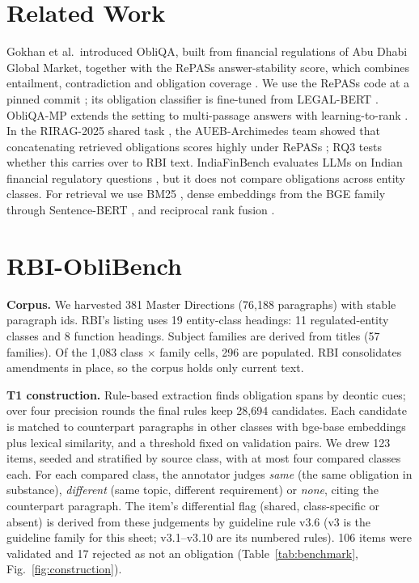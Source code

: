 \documentclass[conference]{IEEEtran}
\begin{document}
\section{Related Work}\label{sec:related}
Gokhan et al.\ introduced ObliQA, built from financial regulations of Abu Dhabi Global Market, together with the RePASs
answer-stability score, which combines entailment, contradiction and obligation coverage \cite{gokhan2024regnlp}. We use the
RePASs code at a pinned commit \cite{repass}; its obligation classifier is fine-tuned from LEGAL-BERT \cite{legalbert}.
ObliQA-MP extends the setting to multi-passage answers with learning-to-rank \cite{obliqamp}. In the RIRAG-2025 shared task
\cite{gokhan2025riragtask}, the AUEB-Archimedes team showed that concatenating retrieved obligations scores highly under RePASs
\cite{aueb2025rirag}; RQ3 tests whether this carries over to RBI text. IndiaFinBench evaluates LLMs on Indian financial
regulatory questions \cite{indiafinbench}, but it does not compare obligations across entity classes. For retrieval we use
BM25 \cite{bm25s}, dense embeddings from the BGE family \cite{bge} through Sentence-BERT \cite{sbert}, and reciprocal rank
fusion \cite{rrf}.

\section{RBI-ObliBench}\label{sec:bench}
\textbf{Corpus.} We harvested 381 Master Directions (76,188 paragraphs)
with stable paragraph ids. RBI's listing uses 19 entity-class headings:
11 regulated-entity classes and 8 function headings.
Subject families are derived from titles (57 families). Of the
1,083 class $\times$ family cells, 296 are populated.
RBI consolidates amendments in place, so the corpus holds only current text.

\textbf{T1 construction.} Rule-based extraction finds obligation spans by deontic cues; over four precision rounds the final rules
keep 28,694 candidates. Each candidate is matched to counterpart paragraphs in other classes with
bge-base embeddings plus lexical similarity, and a threshold fixed on validation pairs. We drew
123 items, seeded and stratified by source class, with at most four compared classes each. For each
compared class, the annotator judges \textit{same} (the same obligation in substance), \textit{different} (same topic, different
requirement) or \textit{none}, citing the counterpart paragraph. The item's differential flag (shared, class-specific or absent) is
derived from these judgements by guideline rule v3.6 (v3 is the guideline family for this sheet; v3.1--v3.10 are its numbered
rules). 106 items were validated and 17
rejected as not an obligation (Table~\ref{tab:benchmark}, Fig.~\ref{fig:construction}).
\end{document}
